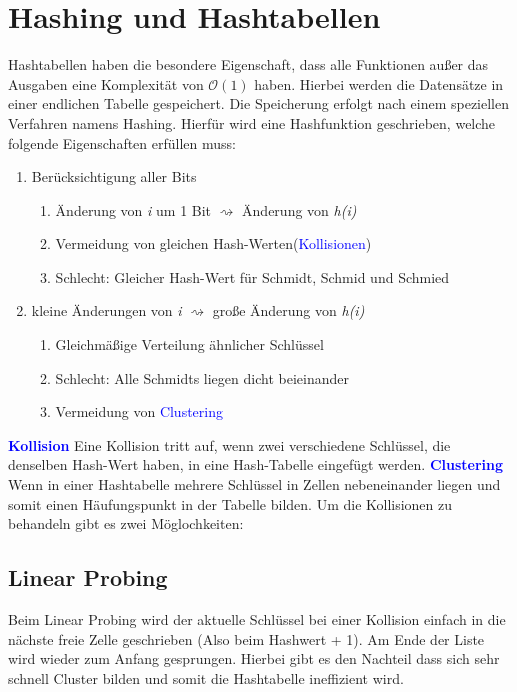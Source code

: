 \documentclass[12pt,a4paper]{article}
\begin{document}
\section{Hashing und Hashtabellen}
Hashtabellen haben die besondere Eigenschaft, dass alle Funktionen außer das Ausgaben eine Komplexität von $\mathcal{O}(1)$ haben. Hierbei werden die Datensätze in einer endlichen Tabelle gespeichert. Die Speicherung erfolgt nach einem speziellen Verfahren namens Hashing. Hierfür wird eine Hashfunktion geschrieben, welche folgende Eigenschaften erfüllen muss:
\begin{enumerate}
	\item Berücksichtigung aller Bits
	\begin{enumerate}
		\item Änderung von \textit{i} um 1 Bit $\rightsquigarrow$ Änderung von \textit{h(i)}
		\item Vermeidung von gleichen Hash-Werten(\textcolor{blue}{Kollisionen})
		\item Schlecht: Gleicher Hash-Wert für Schmidt, Schmid und Schmied
	\end{enumerate}
	\item kleine Änderungen von \textit{i} $\rightsquigarrow$ große Änderung von \textit{h(i)}
	\begin{enumerate}
		\item Gleichmäßige Verteilung ähnlicher Schlüssel
		\item Schlecht: Alle Schmidts liegen dicht beieinander
		\item Vermeidung von \textcolor{blue}{Clustering}
	\end{enumerate}
\end{enumerate}
\textbf{\textcolor{blue}{Kollision}}\newline
Eine Kollision tritt auf, wenn zwei verschiedene Schlüssel, die denselben Hash-Wert haben, in eine Hash-Tabelle eingefügt werden.\newline
\newline
\textbf{\textcolor{blue}{Clustering}}\newline
Wenn in einer Hashtabelle mehrere Schlüssel in Zellen nebeneinander liegen und somit einen Häufungspunkt in der Tabelle bilden.\newline
\newline
Um die Kollisionen zu behandeln gibt es zwei Möglochkeiten:

\subsection{Linear Probing}
Beim Linear Probing wird der aktuelle Schlüssel bei einer Kollision einfach in die nächste freie Zelle geschrieben (Also beim Hashwert + 1). Am Ende der Liste wird wieder zum Anfang gesprungen.\newline
Hierbei gibt es den Nachteil dass sich sehr schnell Cluster bilden und somit die Hashtabelle ineffizient wird.
\end{document}
